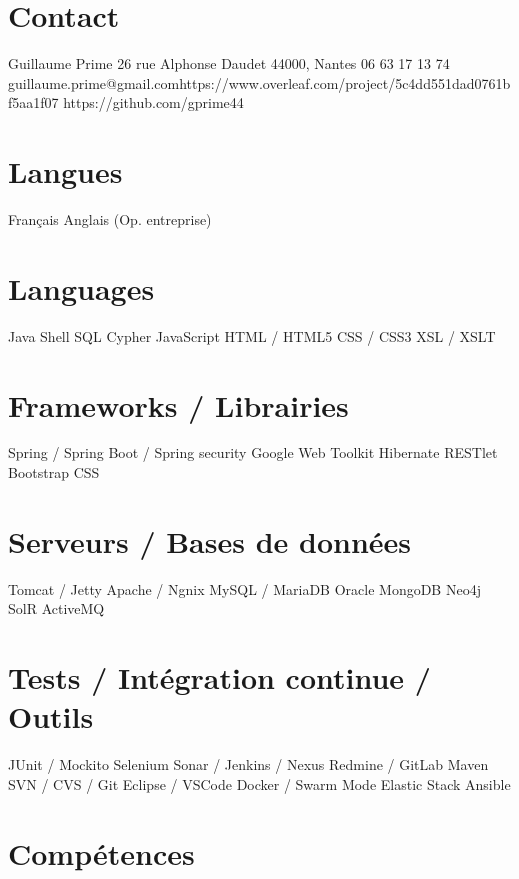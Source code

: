 \documentclass[]{cv-style}          %
\begin{document}


\begin{aside}
%
\section{Contact}
Guillaume Prime
26 rue Alphonse Daudet
44000, Nantes
06 63 17 13 74
guillaume.prime@gmail.comhttps://www.overleaf.com/project/5c4dd551dad0761bf5aa1f07
https://github.com/gprime44
~%
~%
\section{Langues}
Français
Anglais (Op. entreprise)
%
\section{Languages}
Java
Shell
SQL
Cypher
JavaScript
HTML / HTML5
CSS / CSS3
XSL / XSLT
%
\section{Frameworks / Librairies}
Spring / Spring Boot / Spring security
Google Web Toolkit
Hibernate
RESTlet
Bootstrap CSS
\section{Serveurs / Bases de données}
Tomcat / Jetty
Apache / Ngnix
MySQL / MariaDB
Oracle
MongoDB
Neo4j
SolR
ActiveMQ
\section{Tests / Intégration continue / Outils}
JUnit / Mockito
Selenium
Sonar / Jenkins / Nexus
Redmine / GitLab
Maven
SVN / CVS / Git
Eclipse / VSCode
Docker / Swarm Mode
Elastic Stack
Ansible
%
\end{aside}


\section{Compétences}
  \vspace{-0.2cm}
\end{document}
